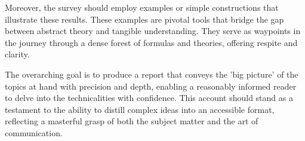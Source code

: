 \documentclass{article}
\begin{document}
Moreover, the survey should employ examples or simple constructions that illustrate these results. These examples are pivotal tools that bridge the gap between abstract theory and tangible understanding. They serve as waypoints in the journey through a dense forest of formulas and theories, offering respite and clarity.

The overarching goal is to produce a report that conveys the 'big picture' of the topics at hand with precision and depth, enabling a reasonably informed reader to delve into the technicalities with confidence. This account should stand as a testament to the ability to distill complex ideas into an accessible format, reflecting a masterful grasp of both the subject matter and the art of communication.
\end{document}
